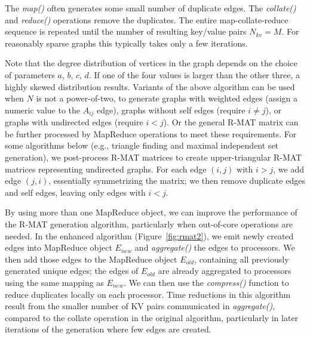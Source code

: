 The {\it map()} often generates some small number of duplicate edges.
The {\it collate()} and {\it reduce()} operations remove the duplicates.  The
entire map-collate-reduce sequence is repeated until the number of
resulting key/value pairs $N_{kv} = M$.  For reasonably sparse graphs
this typically takes only a few iterations.

Note that the degree distribution of vertices in the graph depends on
the choice of parameters $a$, $b$, $c$, $d$.  If one of the four
values is larger than the other three, a highly skewed distribution
results.  Variants of the above algorithm can be used when $N$ is not
a power-of-two, to generate graphs with weighted edges (assign a
numeric value to the $A_{ij}$ edge), graphs without self edges
(require $i \ne j$), or graphs with undirected edges (require $i < j$).
Or the general R-MAT matrix can be further processed by MapReduce
operations to meet these requirements.  For some algorithms below
(e.g., triangle finding and maximal independent set generation), we
post-process R-MAT matrices to create upper-triangular R-MAT
matrices representing undirected graphs.  For each edge $(i,j)$ 
with $i>j$, we add edge $(j,i)$, essentially symmetrizing the matrix; 
we then remove duplicate edges and self edges,
leaving only edges with $i<j$.

By using more than one MapReduce object, we can improve the performance
of the R-MAT generation algorithm, particularly when out-of-core operations
are needed.  In the enhanced algorithm
(Figure~\ref{fig:rmat2}), we emit newly created edges into MapReduce object
$E_{new}$ and {\it aggregate()} the edges to processors.  
We then add those edges
to the MapReduce object $E_{old}$, containing all previously generated
unique edges; the edges of $E_{old}$ are already aggregated to processors
using the same mapping as $E_{new}$.  We can then use the {\it compress()}
function to reduce duplicates locally on each processor.
Time reductions
in this algorithm result from the smaller number of KV pairs communicated in
{\it aggregate()},
compared to the collate operation in the original algorithm, 
particularly in later iterations of the generation where few
edges are created.

